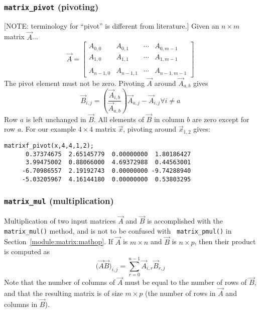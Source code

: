 \subsubsection{{\tt matrix\_pivot} (pivoting)}
\label{module:matrix:pivot}
[NOTE: terminology for ``pivot'' is different from literature.]
Given an $n \times m$ matrix $\vec{A}$...
\[
    \vec{A} = 
    \begin{bmatrix}
        A_{0,0}     & A_{0,1}   & \cdots  & A_{0,m-1} \\
        A_{1,0}     & A_{1,1}   & \cdots  & A_{1,m-1} \\
        \\
        A_{n-1,0}   & A_{n-1,1} & \cdots  & A_{n-1,m-1}
    \end{bmatrix}
\]
The pivot element must not be zero.
Pivoting $\vec{A}$ around $\vec{A}_{a,b}$ gives
\[
    \vec{B}_{i,j} = \left(
                    \frac{\vec{A}_{i,b}}{\vec{A}_{a,b}}
                    \right)
                    \vec{A}_{a,j} - \vec{A}_{i,j}
                    \forall i \ne a
\]
Row $a$ is left unchanged in $\vec{B}$.
All elements of $\vec{B}$ in column $b$ are zero except for row $a$.
For our example $4 \times 4$ matrix $\vec{x}$, pivoting around
$\vec{x}_{1,2}$ gives:
\begin{Verbatim}[fontsize=\small]
    matrixf_pivot(x,4,4,1,2);
      0.37374675  2.65145779  0.00000000  1.80186427
      3.99475002  0.88066000  4.69372988  0.44563001
     -6.70986557  2.19192743  0.00000000 -9.74288940
     -5.03205967  4.16144180  0.00000000  0.53803295
\end{Verbatim}

\subsubsection{{\tt matrix\_mul} (multiplication)}
\label{module:matrix:mul}
Multiplication of two input matrices $\vec{A}$ and $\vec{B}$ is accomplished
with the {\tt matrix\_mul()} method, and is not to be confused with {\tt
matrix\_pmul()} in Section~\ref{module:matrix:mathop}.
If $\vec{A}$ is $m \times n$ and $\vec{B}$ is $n \times p$, then their product
is computed as
\[
    \bigl( \vec{A} \vec{B} \bigr)_{i,j}
        = \sum_{r=0}^{n-1} { \vec{A}_{i,r} \vec{B}_{r,j} }
\]
Note that the number of columns of $\vec{A}$ must be equal to the number of
rows of $\vec{B}$, and that the resulting matrix is of size $m \times p$
(the number of rows in $\vec{A}$ and columns in $\vec{B}$).

%    

